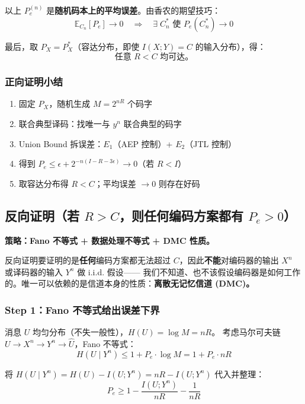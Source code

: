 \documentclass[12pt,a4paper]{ctexart}
\theoremstyle{definition}
\begin{document}
以上 $P_e^{(n)}$ 是\textbf{随机码本上的平均误差}。由香农的期望技巧：
\[
\mathbb{E}_{C_n}[P_e] \to 0 \quad\Longrightarrow\quad \exists\; C_n^* \text{ 使 } P_e(C_n^*) \to 0
\]

最后，取 $P_X = P_X^*$（容达分布，即使 $I(X;Y)=C$ 的输入分布），得：
\[
\text{任意 } R < C \text{ 均可达。}
\]

\subsubsection{正向证明小结}

\begin{enumerate}[nosep]
  \item 固定 $P_X$，随机生成 $M=2^{nR}$ 个码字
  \item 联合典型译码：找唯一与 $y^n$ 联合典型的码字
  \item Union Bound 拆误差：$E_1$（AEP 控制）+ $E_2$（JTL 控制）
  \item 得到 $P_e \leq \epsilon + 2^{-n(I-R-3\epsilon)} \to 0$（若 $R < I$）
  \item 取容达分布得 $R < C$；平均误差 $\to 0$ 则存在好码
\end{enumerate}


\subsection{反向证明（若 $R > C$，则任何编码方案都有 $P_e > 0$）}

\textbf{策略：Fano 不等式 + 数据处理不等式 + DMC 性质。}

反向证明要证明的是\textbf{任何}编码方案都无法超过 $C$，因此\textbf{不能}对编码器的输出 $X^n$ 或译码器的输入 $Y^n$ 做 i.i.d. 假设——
我们不知道、也不该假设编码器是如何工作的。唯一可以依赖的是信道本身的性质：\textbf{离散无记忆信道 (DMC)。}

\subsubsection{Step 1：Fano 不等式给出误差下界}

消息 $U$ 均匀分布（不失一般性），$H(U) = \log M = nR$。
考虑马尔可夫链 $U \to X^n \to Y^n \to \hat{U}$，Fano 不等式：
\[
H(U \mid Y^n) \leq 1 + P_e \cdot \log M = 1 + P_e \cdot nR
\]

将 $H(U \mid Y^n) = H(U) - I(U; Y^n) = nR - I(U; Y^n)$ 代入并整理：
\[
P_e \geq 1 - \frac{I(U; Y^n)}{nR} - \frac{1}{nR}
\]
\end{document}
